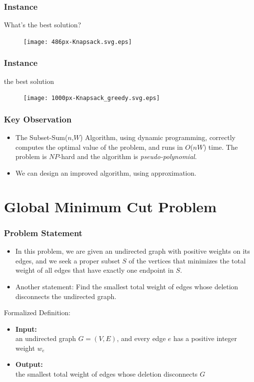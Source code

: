 \documentclass[slidestop,compress,mathserif]{beamer}
\begin{document}
\frame
{
	\frametitle{Instance}
	\begin{center}
	What's the best solution?
	\end{center}
	\begin{figure}
	\texttt{[image: 486px-Knapsack.svg.eps]}
	\end{figure}
}

\frame
{
	\frametitle{Instance}
	\begin{center}
	the best solution
	\end{center}
	\begin{figure}
	\texttt{[image: 1000px-Knapsack\_greedy.svg.eps]}
	\end{figure}
}

\frame
{
	\frametitle{Key Observation}
	\begin{itemize}
		\item The Subset-Sum($n$,$W$) Algorithm, using dynamic programming, correctly computes the optimal value of the problem, and runs in $O$($nW$) time. The problem is $NP$-hard and the algorithm is \emph{pseudo-polynomial}.
		\item We can design an improved algorithm, using approximation.
	\end{itemize}
}

\section{Global Minimum Cut Problem}
\frame
{
\frametitle{Problem Statement}
\begin{itemize}
	\item In this problem, we are given an undirected graph with positive weights on its edges, and we seek a proper subset $S$ of the vertices that minimizes the total weight of all edges that have exactly one endpoint in $S$.
	\item Another statement: Find the smallest total weight of edges whose deletion disconnects the undirected graph.
\end{itemize}
\begin{block}{Formalized Definition:}
	\begin{itemize}
		\item {\bf Input:} \\an undirected graph $G=(V,E)$, and every edge $e$ has a positive integer weight $w_e$
		\item {\bf Output:}\\the smallest total weight of edges whose deletion disconnects $G$
	\end{itemize}
\end{block}
}
\end{document}
